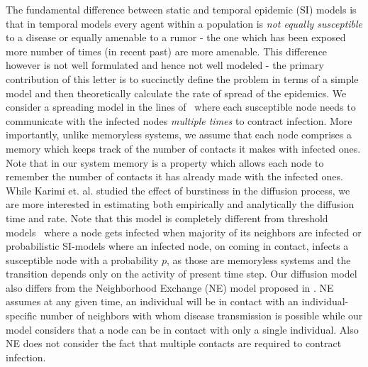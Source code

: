 The fundamental difference between static and temporal epidemic (SI) models is that in temporal models every agent  within a population is {\em not equally susceptible} to a disease or equally amenable to a rumor
 - the one which has been exposed more number of times (in recent past) are more amenable. This difference however is not well formulated and hence not well modeled - the primary contribution of this letter 
is to succinctly define the problem in  terms of a simple model and then theoretically calculate the rate of spread of the epidemics. 
We consider a spreading model in the lines of~\cite{takaguchi2013bursty} where each susceptible node needs to communicate with the 
infected nodes {\em multiple times} to contract infection. More importantly, unlike memoryless systems, we assume that each node comprises a memory which 
keeps track of the number of contacts it makes with infected ones. Note that in our system memory is a property which allows each node to remember the number 
of contacts it has already made with the infected ones. While Karimi et. al. studied the effect of burstiness in the diffusion process, we 
are more interested in estimating both empirically and analytically the diffusion time and rate.
Note that this model is completely different from  threshold models~\cite{granovetter1978threshold,sur1} where a node
 gets infected when majority of its neighbors are infected or probabilistic SI-models where an infected node,  on coming in contact, 
infects a susceptible node with a probability $p$,  as those are memoryless systems and the transition depends only on the activity of present time step. 
Our diffusion model also differs from the Neighborhood Exchange (NE) model proposed in \cite{volz2007susceptible}. NE assumes at any given time, an individual
will be in contact with an individual-specific number of neighbors with whom disease transmission is possible while our model considers that a node can be in contact with 
only a single individual. Also NE does not consider the fact that multiple contacts are required to contract infection.

